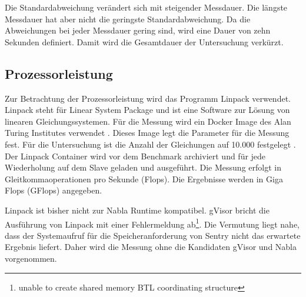 Die Standardabweichung verändert sich mit steigender Messdauer. Die längste Messdauer hat aber nicht die geringste Standardabweichung. Da die Abweichungen bei jeder Messdauer gering sind, wird eine Dauer von zehn Sekunden definiert. Damit wird die Gesamtdauer der Untersuchung verkürzt.

\subsection{Prozessorleistung}
Zur Betrachtung der Prozessorleistung wird das Programm Linpack verwendet. Linpack steht für Linear System Package und ist eine Software zur Lösung von linearen Gleichungssystemen. Für die Messung wird ein Docker Image des Alan Turing Institutes verwendet \cite[vgl.][]{EdChalstrey.20.2.2020}. Dieses Image legt die Parameter für die Messung fest. Für die Untersuchung ist die Anzahl der Gleichungen auf 10.000 festgelegt \cite[vgl.][]{EdChalstrey.20190716}. Der Linpack Container wird vor dem Benchmark archiviert und für jede Wiederholung auf dem Slave geladen und ausgeführt. Die Messung erfolgt in Gleitkommaoperationen pro Sekunde (Flops). Die Ergebnisse werden in Giga Flops (GFlops) angegeben. 

Linpack ist bisher nicht zur Nabla Runtime kompatibel. gVisor bricht die Ausführung von Linpack mit einer Fehlermeldung ab\footnote{unable to create shared memory BTL coordinating structure}. Die Vermutung liegt nahe, dass der Systemaufruf für die Speicheranforderung von Sentry nicht das erwartete Ergebnis liefert. Daher wird die Messung ohne die Kandidaten gVisor und Nabla vorgenommen.
